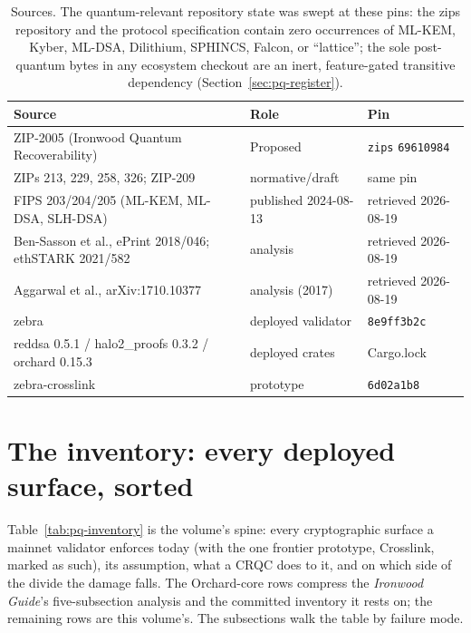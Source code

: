 \documentclass[11pt,a4paper]{article}
\theoremstyle{definition}
\begin{document}
\begin{table}[ht]
\centering
\small
\begin{tabular}{@{}lll@{}}
\toprule
Source & Role & Pin \\
\midrule
ZIP-2005 (Ironwood Quantum Recoverability) & Proposed & \texttt{zips} \texttt{69610984} \\
ZIPs 213, 229, 258, 326; ZIP-209 & normative/draft & same pin \\
FIPS 203/204/205 (ML-KEM, ML-DSA, SLH-DSA) & published 2024-08-13 & retrieved 2026-08-19 \\
Ben-Sasson et al., ePrint 2018/046; ethSTARK 2021/582 & analysis & retrieved 2026-08-19 \\
Aggarwal et al., arXiv:1710.10377 & analysis (2017) & retrieved 2026-08-19 \\
\textsf{zebra} & deployed validator & \texttt{8e9ff3b2c} \\
\textsf{reddsa} 0.5.1 / \textsf{halo2\_proofs} 0.3.2 / \textsf{orchard} 0.15.3 & deployed crates & Cargo.lock \\
\textsf{zebra-crosslink} & prototype & \texttt{6d02a1b8} \\
\bottomrule
\end{tabular}
\caption{Sources. The quantum-relevant repository state was swept at
these pins: the zips repository and the protocol specification contain
zero occurrences of ML-KEM, Kyber, ML-DSA, Dilithium, SPHINCS, Falcon,
or ``lattice''; the sole post-quantum bytes in any ecosystem checkout
are an inert, feature-gated transitive dependency
(Section~\ref{sec:pq-register}).}
\label{tab:pq-sources}
\end{table}

\FloatBarrier

\section{The inventory: every deployed surface, sorted}\label{sec:pq-inventory}

Table~\ref{tab:pq-inventory} is the volume's spine: every cryptographic
surface a mainnet validator enforces today (with the one frontier
prototype, Crosslink, marked as such), its assumption, what a CRQC
does to it, and on which side of the divide the damage falls. The
Orchard-core rows compress the \emph{Ironwood Guide}'s five-subsection
analysis and the committed inventory it rests on; the remaining rows are
this volume's. The subsections walk the table by failure mode.
\end{document}
